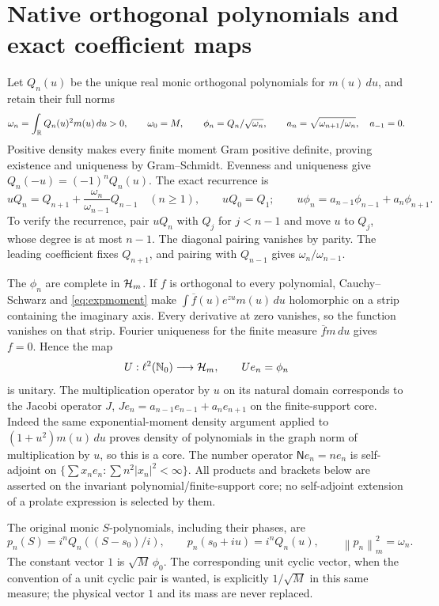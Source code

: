 \documentclass[11pt]{article}
\newcommand{\norm}[1]{\left\lVert#1\right\rVert}
\begin{document}
\section{Native orthogonal polynomials and exact coefficient maps}

Let $Q_n(u)$ be the unique real monic orthogonal polynomials for
$m(u)\,du$, and retain their full norms
\begin{equation}\label{eq:norms}
 \omega_n=\int_\mathbb R Q_n(u)^2m(u)\,du>0,\qquad
 \omega_0=M,\qquad
 \phi_n=Q_n/\sqrt{\omega_n},\qquad
 a_n=\sqrt{\omega_{n+1}/\omega_n},\quad a_{-1}=0.
\end{equation}
Positive density makes every finite moment Gram positive
definite, proving existence and uniqueness by Gram--Schmidt.
Evenness and uniqueness give $Q_n(-u)=(-1)^nQ_n(u)$.
The exact recurrence is
\begin{equation}\label{eq:recurrence}
 uQ_n=Q_{n+1}+\frac{\omega_n}{\omega_{n-1}}Q_{n-1}
 \quad(n\geq1),\qquad uQ_0=Q_1;
 \qquad
 u\phi_n=a_{n-1}\phi_{n-1}+a_n\phi_{n+1}.
\end{equation}
To verify the recurrence, pair $uQ_n$ with $Q_j$ for $j<n-1$
and move $u$ to $Q_j$, whose degree is at most $n-1$.
The diagonal pairing vanishes by parity. The leading
coefficient fixes $Q_{n+1}$, and pairing with $Q_{n-1}$
gives $\omega_n/\omega_{n-1}$.

The $\phi_n$ are complete in $\mathcal H_m$. If $f$ is orthogonal
to every polynomial, Cauchy--Schwarz and \eqref{eq:expmoment}
make $\int\overline f(u)e^{zu}m(u)\,du$ holomorphic on a
strip containing the imaginary axis. Every derivative at
zero vanishes, so the function vanishes on that strip.
Fourier uniqueness for the finite measure $\overline f m\,du$
gives $f=0$. Hence the map
\[
 U:\ell^2(\mathbb N_0)\longrightarrow\mathcal H_m,\qquad Ue_n=\phi_n
\]
is unitary. The multiplication operator by $u$ on its natural
domain corresponds to the Jacobi operator $J$,
$Je_n=a_{n-1}e_{n-1}+a_ne_{n+1}$ on the finite-support core.
Indeed the same exponential-moment density argument applied
to $(1+u^2)m(u)\,du$ proves density of polynomials in the
graph norm of multiplication by $u$, so this is a core.
The number operator $\mathsf N e_n=ne_n$ is self-adjoint
on $\{\sum x_ne_n:\sum n^2|x_n|^2<\infty\}$.
All products and brackets below are asserted on the
invariant polynomial/finite-support core; no self-adjoint
extension of a prolate expression is selected by them.

The original monic $S$-polynomials, including their phases, are
\begin{equation}\label{eq:physical-polys}
 p_n(S)=i^nQ_n((S-s_0)/i),\qquad
 p_n(s_0+iu)=i^nQ_n(u),\qquad \norm{p_n}_m^2=\omega_n.
\end{equation}
The constant vector $1$ is $\sqrt M\,\phi_0$.
The corresponding unit cyclic vector, when the convention of
a unit cyclic pair is wanted, is explicitly $1/\sqrt M$
in this same measure; the physical vector $1$ and its mass
are never replaced.
\end{document}
